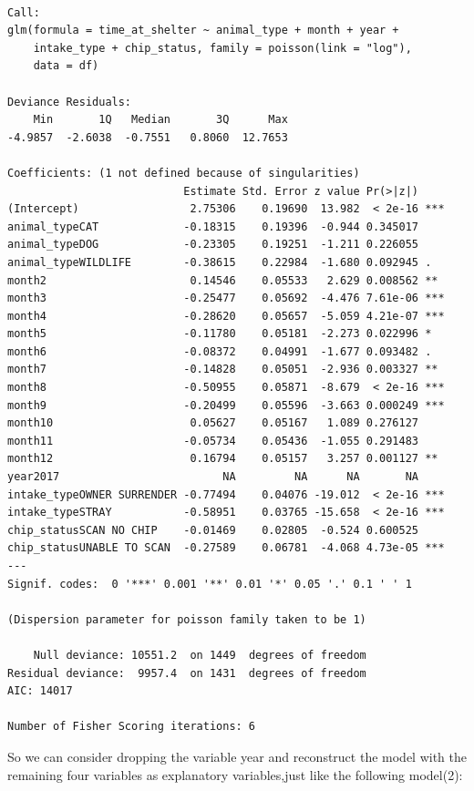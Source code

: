 \documentclass[
]{article}
\begin{document}
\begin{verbatim}

Call:
glm(formula = time_at_shelter ~ animal_type + month + year + 
    intake_type + chip_status, family = poisson(link = "log"), 
    data = df)

Deviance Residuals: 
    Min       1Q   Median       3Q      Max  
-4.9857  -2.6038  -0.7551   0.8060  12.7653  

Coefficients: (1 not defined because of singularities)
                           Estimate Std. Error z value Pr(>|z|)    
(Intercept)                 2.75306    0.19690  13.982  < 2e-16 ***
animal_typeCAT             -0.18315    0.19396  -0.944 0.345017    
animal_typeDOG             -0.23305    0.19251  -1.211 0.226055    
animal_typeWILDLIFE        -0.38615    0.22984  -1.680 0.092945 .  
month2                      0.14546    0.05533   2.629 0.008562 ** 
month3                     -0.25477    0.05692  -4.476 7.61e-06 ***
month4                     -0.28620    0.05657  -5.059 4.21e-07 ***
month5                     -0.11780    0.05181  -2.273 0.022996 *  
month6                     -0.08372    0.04991  -1.677 0.093482 .  
month7                     -0.14828    0.05051  -2.936 0.003327 ** 
month8                     -0.50955    0.05871  -8.679  < 2e-16 ***
month9                     -0.20499    0.05596  -3.663 0.000249 ***
month10                     0.05627    0.05167   1.089 0.276127    
month11                    -0.05734    0.05436  -1.055 0.291483    
month12                     0.16794    0.05157   3.257 0.001127 ** 
year2017                         NA         NA      NA       NA    
intake_typeOWNER SURRENDER -0.77494    0.04076 -19.012  < 2e-16 ***
intake_typeSTRAY           -0.58951    0.03765 -15.658  < 2e-16 ***
chip_statusSCAN NO CHIP    -0.01469    0.02805  -0.524 0.600525    
chip_statusUNABLE TO SCAN  -0.27589    0.06781  -4.068 4.73e-05 ***
---
Signif. codes:  0 '***' 0.001 '**' 0.01 '*' 0.05 '.' 0.1 ' ' 1

(Dispersion parameter for poisson family taken to be 1)

    Null deviance: 10551.2  on 1449  degrees of freedom
Residual deviance:  9957.4  on 1431  degrees of freedom
AIC: 14017

Number of Fisher Scoring iterations: 6
\end{verbatim}

So we can consider dropping the variable year and reconstruct the model
with the remaining four variables as explanatory variables,just like the
following model(2):
\end{document}
